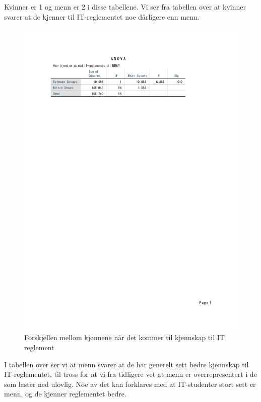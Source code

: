 Kvinner er 1 og menn er 2 i disse tabellene. Vi ser fra tabellen over at kvinner svarer at de kjenner til IT-reglementet noe dårligere enn menn. 
\begin{figure}[H]
    \centering
    \includegraphics[scale=0.7]{case_1/bilder/kjonn_kjent_anova.pdf}
    \caption[Forskjell mellom kjønn på kjennskap til IT reglement]{Forskjellen mellom kjønnene når det kommer til kjennskap til IT reglement}
    \label{fig:fakultet_pastander_anova}
\end{figure}

I tabellen over ser vi at menn svarer at de har generelt sett bedre kjennskap til IT-reglementet, til tross for at vi fra tidligere vet at menn er overrepresentert i de som laster ned ulovlig. Noe av det kan forklares med at IT-studenter stort sett er menn, og de kjenner reglementet bedre.

